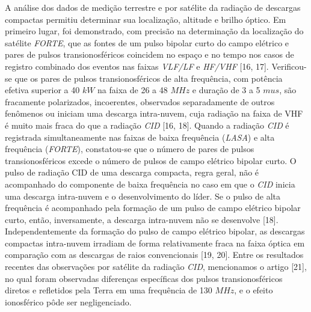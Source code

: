 \documentclass[a4paper, 12pt, onecolumn,singlespacing]{article}
\begin{document}
	A análise dos dados de medição terrestre e por satélite da radiação de descargas compactas permitiu determinar sua localização, altitude e brilho óptico. Em primeiro lugar, foi demonstrado, com precisão na determinação da localização do satélite \textit{FORTE}, que as fontes de um pulso bipolar curto do campo elétrico e pares de pulsos transionosféricos coincidem no espaço e no tempo nos casos de registro combinado dos eventos nas faixas \textit{VLF/LF} e \textit{HF/VHF} [16, 17]. Verificou-se que os pares de pulsos transionosféricos de alta frequência, com potência efetiva superior a 40 $kW$ na faixa de 26 a 48 $MHz$ e duração de 3 a 5 $mu s$, são fracamente polarizados, incoerentes, observados separadamente de outros fenômenos ou iniciam uma descarga intra-nuvem, cuja radiação na faixa de VHF é muito mais fraca do que a radiação \textit{CID} [16, 18]. Quando a radiação \textit{CID} é registrada simultaneamente nas faixas de baixa frequência (\textit{LASA}) e alta frequência (\textit{FORTE}), constatou-se que o número de pares de pulsos transionosféricos excede o número de pulsos de campo elétrico bipolar curto. O pulso de radiação CID de uma descarga compacta, regra geral, não é acompanhado do componente de baixa frequência no caso em que o \textit{CID} inicia uma descarga intra-nuvem e o desenvolvimento do líder. Se o pulso de alta frequência é acompanhado pela formação de um pulso de campo elétrico bipolar curto, então, inversamente, a descarga intra-nuvem não se desenvolve [18]. Independentemente da formação do pulso de campo elétrico bipolar, as descargas compactas intra-nuvem irradiam de forma relativamente fraca na faixa óptica em comparação com as descargas de raios convencionais [19, 20]. Entre os resultados recentes das observações por satélite da radiação \textit{CID}, mencionamos o artigo [21], no qual foram observadas diferenças específicas dos pulsos transionosféricos diretos e refletidos pela Terra em uma frequência de 130 $MHz$, e o efeito ionosférico pôde ser negligenciado.
	
\end{document}
